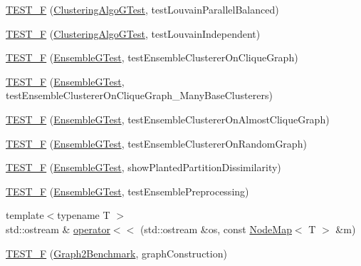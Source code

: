\begin{DoxyCompactItemize}
\hyperlink{namespace_ensemble_clustering_a253804b50cd7eb2ae34316a4e316f44b}{T\-E\-S\-T\-\_\-\-F} (\hyperlink{class_ensemble_clustering_1_1_clustering_algo_g_test}{Clustering\-Algo\-G\-Test}, test\-Louvain\-Parallel\-Balanced)
\item 
\hyperlink{namespace_ensemble_clustering_a17619de4bdcf03ba1cac5a6e51a7a107}{T\-E\-S\-T\-\_\-\-F} (\hyperlink{class_ensemble_clustering_1_1_clustering_algo_g_test}{Clustering\-Algo\-G\-Test}, test\-Louvain\-Independent)
\item 
\hyperlink{namespace_ensemble_clustering_a8b2649efc82896b20c6e34227cf2636f}{T\-E\-S\-T\-\_\-\-F} (\hyperlink{class_ensemble_clustering_1_1_ensemble_g_test}{Ensemble\-G\-Test}, test\-Ensemble\-Clusterer\-On\-Clique\-Graph)
\item 
\hyperlink{namespace_ensemble_clustering_a720f5e365080ef870c449a7118a48844}{T\-E\-S\-T\-\_\-\-F} (\hyperlink{class_ensemble_clustering_1_1_ensemble_g_test}{Ensemble\-G\-Test}, test\-Ensemble\-Clusterer\-On\-Clique\-Graph\-\_\-\-Many\-Base\-Clusterers)
\item 
\hyperlink{namespace_ensemble_clustering_add684a95eac3690e4dc2567dc5ee3047}{T\-E\-S\-T\-\_\-\-F} (\hyperlink{class_ensemble_clustering_1_1_ensemble_g_test}{Ensemble\-G\-Test}, test\-Ensemble\-Clusterer\-On\-Almost\-Clique\-Graph)
\item 
\hyperlink{namespace_ensemble_clustering_a7d2d215f2535afecc3c10aa0fd8badd1}{T\-E\-S\-T\-\_\-\-F} (\hyperlink{class_ensemble_clustering_1_1_ensemble_g_test}{Ensemble\-G\-Test}, test\-Ensemble\-Clusterer\-On\-Random\-Graph)
\item 
\hyperlink{namespace_ensemble_clustering_a78150166031e2256139c7765897aa550}{T\-E\-S\-T\-\_\-\-F} (\hyperlink{class_ensemble_clustering_1_1_ensemble_g_test}{Ensemble\-G\-Test}, show\-Planted\-Partition\-Dissimilarity)
\item 
\hyperlink{namespace_ensemble_clustering_ace2d29fce8dedf0a5ea3e0a5989d4f41}{T\-E\-S\-T\-\_\-\-F} (\hyperlink{class_ensemble_clustering_1_1_ensemble_g_test}{Ensemble\-G\-Test}, test\-Ensemble\-Preprocessing)
\item 
{\footnotesize template$<$typename T $>$ }\\std\-::ostream \& \hyperlink{namespace_ensemble_clustering_ad9e7cf69bac7cfc12a789ba64eeb2c9e}{operator$<$$<$} (std\-::ostream \&os, const \hyperlink{class_ensemble_clustering_1_1_node_map}{Node\-Map}$<$ T $>$ \&m)
\item 
\hyperlink{namespace_ensemble_clustering_adb73e5e4af69fbca59c02f30f5f7b8d6}{T\-E\-S\-T\-\_\-\-F} (\hyperlink{class_ensemble_clustering_1_1_graph2_benchmark}{Graph2\-Benchmark}, graph\-Construction)

\end{DoxyCompactItemize}
